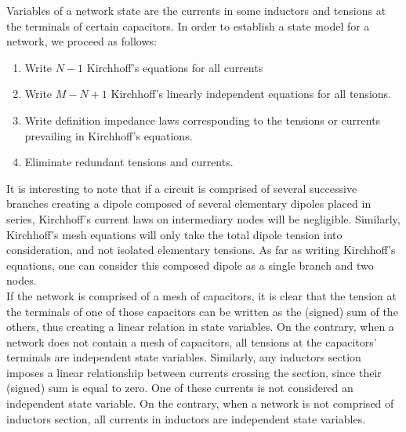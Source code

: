 Variables of a network state are the currents in some inductors and tensions at the terminals of certain capacitors. In order to establish a state model for a network, we proceed as follows:
\begin{enumerate}
\item Write $N - 1$ Kirchhoff’s equations for all currents
\item Write $M - N +1$ Kirchhoff’s linearly independent equations for all tensions.
\item Write definition impedance laws corresponding to the tensions or currents prevailing in Kirchhoff’s equations.
\item 	Eliminate redundant tensions and currents.
\end{enumerate}

It is interesting to note that if a circuit is comprised of several successive branches creating a dipole composed of several elementary dipoles placed in series, Kirchhoff’s current laws on intermediary nodes will be negligible.  Similarly, Kirchhoff’s mesh equations will only take the total dipole tension into consideration, and not isolated elementary tensions.  As far as writing Kirchhoff’s equations, one can consider this composed dipole as a single branch and two nodes.\\

If the network is comprised of a mesh of capacitors, it is clear that the tension at the terminals of one of those capacitors can be written as the (signed) sum of the others, thus creating a linear relation in state variables.  On the contrary, when a network does not contain a mesh of capacitors, all tensions at the capacitors’ terminals are independent state variables.  Similarly, any inductors section imposes a linear relationship between currents crossing the section, since their (signed) sum is equal to zero.  One of these currents is not considered an independent state variable.  On the contrary, when a network is not comprised of inductors section, all currents in inductors are independent state variables.

